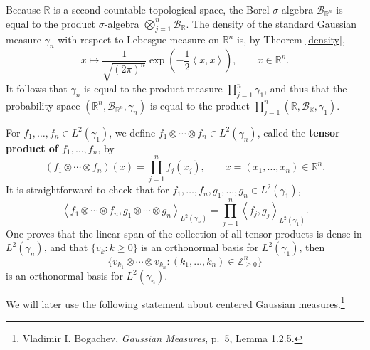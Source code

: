 \documentclass{article}
\newcommand{\inner}[2]{\left\langle #1, #2 \right\rangle}
\theoremstyle{definition}
\begin{document}
Because $\mathbb{R}$ is a second-countable topological space, the Borel $\sigma$-algebra
$\mathscr{B}_{\mathbb{R}^n}$ is equal to the product 
$\sigma$-algebra $\bigotimes_{j=1}^n \mathscr{B}_{\mathbb{R}}$. 
The density of the standard Gaussian measure $\gamma_n$ with respect to Lebesgue measure on
$\mathbb{R}^n$ is, by Theorem \ref{density},
\[
x \mapsto \frac{1}{\sqrt{(2\pi)^n}} \exp\left(-\frac{1}{2}\inner{x}{x} \right), \qquad x \in \mathbb{R}^n.
\]
It follows that $\gamma_n$ is equal to the product measure $\prod_{j=1}^n \gamma_1$, and thus that the probability
space $(\mathbb{R}^n,\mathscr{B}_{\mathbb{R}^n},\gamma_n)$ is equal to the product $\prod_{j=1}^n (\mathbb{R},\mathscr{B}_{\mathbb{R}},
\gamma_1)$. 

For $f_1,\ldots,f_n \in L^2(\gamma_1)$, we define $f_1 \otimes \cdots \otimes f_n \in L^2(\gamma_n)$,
called the \textbf{tensor product of $f_1,\ldots,f_n$}, by
\[
(f_1 \otimes \cdots \otimes f_n)(x) = \prod_{j=1}^n f_j(x_j), \qquad x = (x_1,\ldots,x_n) \in \mathbb{R}^n.
\]
It is straightforward to check that for $f_1,\ldots,f_n,g_1,\ldots,g_n \in L^2(\gamma_1)$,
\[
\inner{f_1\otimes \cdots \otimes f_n}{g_1 \otimes \cdots \otimes g_n}_{L^2(\gamma_n)}
=\prod_{j=1}^n \inner{f_j}{g_j}_{L^2(\gamma_1)}.
\]
One proves that the linear span of the collection of all tensor products is dense in $L^2(\gamma_n)$, and that 
$\{v_k: k \geq 0\}$ is an orthonormal basis for $L^2(\gamma_1)$, then
\begin{equation}
\{v_{k_1} \otimes \cdots \otimes v_{k_n}: (k_1,\ldots,k_n) \in \mathbb{Z}_{\geq 0}^n\}
\label{tensor}
\end{equation}
is an orthonormal basis for $L^2(\gamma_n)$. 


We will later use the following statement about  centered Gaussian measures.\footnote{Vladimir I. Bogachev,
{\em Gaussian Measures}, p.~5, Lemma 1.2.5.}
\end{document}
